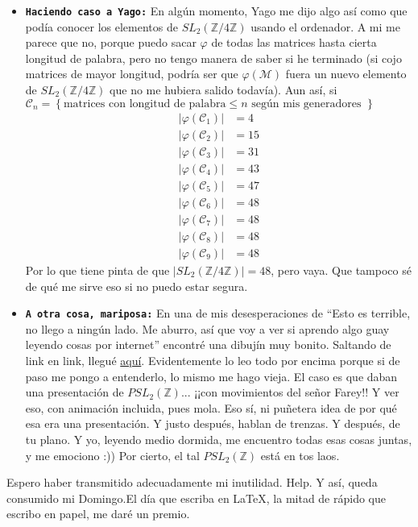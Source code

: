 \documentclass{article}
\newcommand\tab[1][0.6cm]{\hspace*{#1}}
\newcommand\nl{\newline\tab}
\begin{document}
\begin{itemize}
	 	
	 	\item \textbf{\texttt {Haciendo caso a Yago:}} En algún momento, Yago me dijo algo así como que podía conocer los elementos de $SL_2(\mathbb{Z}/4\mathbb{Z})$ usando el ordenador. \nl
	 	 A mi me parece que no, porque puedo sacar $\varphi$ de todas las matrices hasta cierta longitud de palabra, pero no tengo manera de saber si he terminado (si cojo matrices de mayor longitud, podría ser que $\varphi(\mathcal{M})$ fuera un nuevo elemento de $SL_2(\mathbb{Z}/4\mathbb{Z})$ que no me hubiera salido todavía). \nl 
	 	 Aun así, si $\mathcal{C}_n = \left\{ \text{matrices con longitud de palabra} \leq n\text{ según mis generadores }\right\}$	 	 
	 	 \begin{align*}
	 	  | \varphi(\mathcal{C}_1) | &= 4 \\	 	 
	 	  | \varphi(\mathcal{C}_2) | &= 15 \\	 	 
	 	  | \varphi(\mathcal{C}_3) | &= 31 \\	 	 
	 	  | \varphi(\mathcal{C}_4) | &= 43 \\	 	 
	 	  | \varphi(\mathcal{C}_5) | &= 47 \\	 	 
	 	  | \varphi(\mathcal{C}_6) | &= 48 \\	 	 
	 	  | \varphi(\mathcal{C}_7) | &= 48 \\	 	 
	 	  | \varphi(\mathcal{C}_8) | &= 48 \\	 	 
	 	  | \varphi(\mathcal{C}_9) | &= 48
	 	\end{align*}
	 	 \tab Por lo que tiene pinta de que $|SL_2(\mathbb{Z}/4\mathbb{Z})| = 48$, pero vaya. Que tampoco sé de qué me sirve eso si no puedo estar segura. 
	 	
	 	 
	 	 \item \textbf{\texttt {A otra cosa, mariposa:}} En una de mis desesperaciones de  ``Esto es terrible, no llego a ningún lado. Me aburro, así que voy a ver si aprendo algo guay leyendo cosas por internet'' encontré una dibujín muy bonito. Saltando de link en link, llegué \href{https://en.wikipedia.org/wiki/Modular_group}{aquí}. Evidentemente lo leo todo por encima porque si de paso me pongo a entenderlo, lo mismo me hago vieja. El caso es que daban una presentación de $PSL_2(\mathbb{Z})$... ¡¡con movimientos del señor Farey!! Y ver eso, con animación incluida, pues mola. Eso sí, ni puñetera idea de por qué esa era una presentación. Y justo después, hablan de trenzas. Y después, de tu plano. Y yo, leyendo medio dormida, me encuentro todas esas cosas juntas, y me emociono :)) \nl Por cierto, el tal $PSL_2(\mathbb{Z})$ está en tos laos. \nl
	\end{itemize}

	Espero haber transmitido adecuadamente mi inutilidad.\nl
	Help.\nl 
	Y así, queda consumido mi Domingo.\nl El día que escriba en \LaTeX,  la mitad de rápido que escribo en papel, me daré un premio.
	
\end{document}
